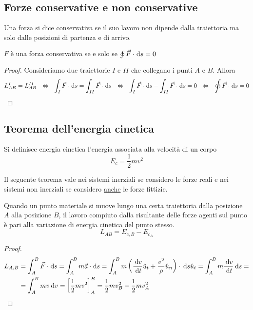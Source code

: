 \documentclass{article}
\theoremstyle{plain}
\begin{document}
\subsection{Forze conservative e non conservative}
\begin{boxdef}
    Una forza si dice conservativa se il suo lavoro non dipende dalla traiettoria ma solo dalle posizioni di partenza e di arrivo.
\end{boxdef}
\begin{lemma}
    $F$ è una forza conservativa se e solo se $\oint \vec F\cdot\! \:\text{d} s=0$
\end{lemma}
\begin{proof}
    Consideriamo due traiettorie $I$ e $II$ che collegano i punti $A$ e $B$. Allora 
    \[L_{AB}^I=L_{AB}^{II}~~\Leftrightarrow~~\int_I\vec F\cdot\! \:\text{d} s=\int _{II}\vec F\cdot\! \:\text{d} s~~\Leftrightarrow~~\int_I\vec F\cdot\! \:\text{d} s-\int _{II}\vec F\cdot\! \:\text{d} s=0~~\Leftrightarrow~~\oint \vec F\cdot\! \:\text{d} s=0\]
\end{proof}
\subsection{Teorema dell'energia cinetica}
\begin{boxdef}
    Si definisce energia cinetica l'energia associata alla velocità di un corpo
    \[E_c=\frac{1}{2}mv^2\]
\end{boxdef}
Il seguente teorema vale nei sistemi inerziali se considero le forze reali e nei sistemi non inerziali se considero \underline{anche} le forze fittizie.
\begin{shadedTheorem}
    Quando un punto materiale si muove lungo una certa traiettoria dalla posizione $A$ alla posizione $B$, il lavoro compiuto dalla risultante delle forze agenti sul punto è pari alla variazione di energia cinetica del punto stesso.
    \[L_{AB}=E_{c,B}-E_{c_A}\]
\end{shadedTheorem}
\begin{proof}
    \[
    \begin{aligned}
        L_{A,B}&=\int_A^B\vec F\cdot \! \:\text{d} s=\int _A^Bm\vec a \cdot \! \:\text{d} s= \int _A^Bm\left( \frac{\:\text{d} v}{\:\text{d} t}\hat u_t+\frac{v^2}{\rho}\hat u_n\right)\cdot \:\text{d} s \hat u_t=\int _A^Bm\frac{\:\text{d} v}{\:\text{d} t}\:\text{d} s=\\&=\int_A^Bmv\:\text{d} v=\left[ \frac{1}{2}mv^2 \right]_A^B=\frac{1}{2}mv^2_B-\frac{1}{2}mv^2_A
    \end{aligned}\]

\end{proof}
\end{document}
